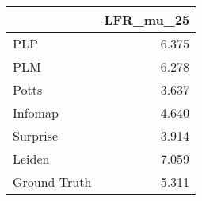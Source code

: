 \begin{tabular}{lr}
\toprule
{} & LFR_mu_25 \\
\midrule
PLP          &     6.375 \\
PLM          &     6.278 \\
Potts        &     3.637 \\
Infomap      &     4.640 \\
Surprise     &     3.914 \\
Leiden       &     7.059 \\
Ground Truth &     5.311 \\
\bottomrule
\end{tabular}
